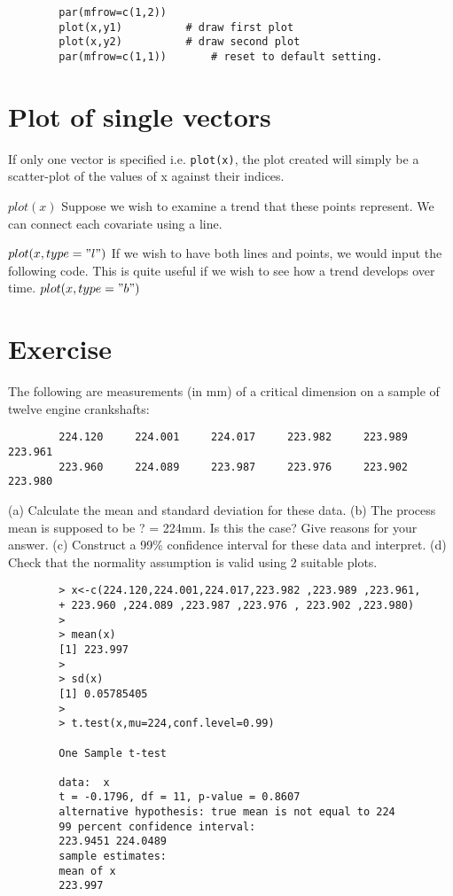 \documentclass[a4paper,12pt]{article}
\begin{document}
\begin{itemize}
		\begin{verbatim}
		par(mfrow=c(1,2))
		plot(x,y1)			# draw first plot
		plot(x,y2)			# draw second plot
		par(mfrow=c(1,1))		# reset to default setting.
		\end{verbatim}
		
		\section{Plot of single vectors}
		If only one vector is specified i.e. \texttt{plot(x)},  the plot created will simply be a scatter-plot of the values of x against their indices.
		
		$plot(x)$
		Suppose we wish to examine a trend that these points represent. We can connect each covariate using a line.
		
		$plot(x, type = "l")$
		If we wish to have both lines and points, we would input the following code. This is quite useful if we wish to see how a trend develops over time.
		$plot(x, type = "b")$
		
		
		
		
		
		
		
		
		
		\section{Exercise} The following are measurements (in mm) of a critical
		dimension on a sample of twelve engine crankshafts:
		
		\begin{verbatim}
		224.120 	224.001 	224.017 	223.982 	223.989 	223.961
		223.960 	224.089 	223.987 	223.976 	223.902 	223.980
		\end{verbatim}
		(a) Calculate the mean and standard deviation for these data.
		(b) The process mean is supposed to be ? = 224mm. Is this the
		case? Give reasons for your answer.
		(c) Construct a 99\% confidence interval for these data and interpret.
		(d) Check that the normality assumption is valid using 2 suitable plots.
		
		\begin{verbatim}
		> x<-c(224.120,224.001,224.017,223.982 ,223.989 ,223.961,
		+ 223.960 ,224.089 ,223.987 ,223.976 , 223.902 ,223.980)
		>
		> mean(x)
		[1] 223.997
		>
		> sd(x)
		[1] 0.05785405
		>
		> t.test(x,mu=224,conf.level=0.99)
		
		One Sample t-test
		
		data:  x
		t = -0.1796, df = 11, p-value = 0.8607
		alternative hypothesis: true mean is not equal to 224
		99 percent confidence interval:
		223.9451 224.0489
		sample estimates:
		mean of x
		223.997
		

\end{verbatim}
\end{itemize}
\end{document}
